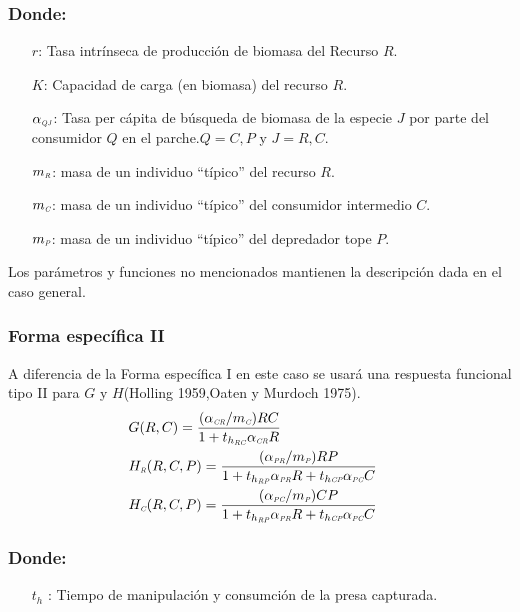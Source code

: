 \documentclass[a4paper,11pt]{article}
\newcommand{\PP}{\textit{\tiny P}}
\newcommand{\C}{\textit{\tiny C}}
\newcommand{\R}{\textit{\tiny R}}
\newcommand{\CR}{\textit{\tiny CR}}
\newcommand{\PC}{\textit{\tiny PC}}
\newcommand{\PR}{\textit{\tiny PR}}
\newcommand{\CP}{\textit{\tiny CP}}
\newcommand{\RC}{\textit{\tiny RC}}
\newcommand{\RP}{\textit{\tiny RP}}
\begin{document}
\subsubsection*{Donde:}
\begin{itemize}
\item[]$r$: Tasa intr\'inseca de producci\'on de biomasa del Recurso $R$.
\item[]$K$: Capacidad de carga (en biomasa) del recurso $R$.
\item[]$\alpha_{\textit{\tiny QJ}} $: Tasa per c\'apita de b\'usqueda de biomasa de la especie $J$  por parte del consumidor $Q$ en el parche.$Q=C,P$ y $J=R,C$.
\item[]$m_\R$: masa de un individuo ``t\'ipico'' del recurso $R$.
\item[]$m_\C$: masa de un individuo ``t\'ipico'' del consumidor intermedio $C$.
\item[]$m_\textit{\tiny P}$: masa de un individuo ``t\'ipico'' del depredador tope $P$.
\end{itemize}
Los par\'ametros y funciones no mencionados mantienen la descripci\'on dada en el caso general.\\
\subsubsection*{Forma espec\'ifica II}
A diferencia de la Forma espec\'ifica I en este caso se usar\'a una respuesta funcional tipo II para $G$ y $H$(Holling 1959,Oaten y Murdoch 1975).
\begin{align}
&G(R,C)=\frac{(\alpha_{\CR}/m_\C)RC}{1+t_{h_{\RC}}\alpha_{\CR}R}&\\
&H_{\R}(R,C,P)=\frac{(\alpha_{\PR}/m_\PP)RP}{1+t_{h_{\RP}}\alpha_{\PR}R+t_{h{\CP}}\alpha_{\PC}C}\\
&H_{\C}(R,C,P)=\frac{(\alpha_{\PC}/m_\PP)CP}{1+t_{h_{\RP}}\alpha_{\PR}R+t_{h{\CP}}\alpha_{\PC}C}
\end{align}
\subsubsection*{Donde:}
\begin{itemize}
\item[$t_{h}$]: Tiempo de manipulaci\'on y consumci\'on de la presa capturada.
\end{itemize}
\end{document}
